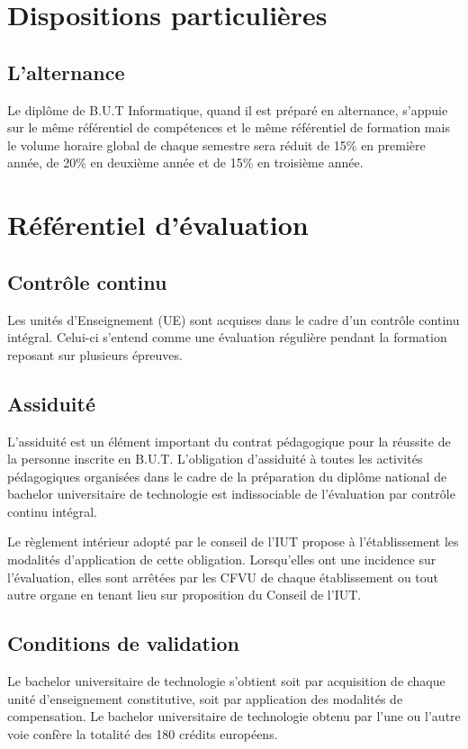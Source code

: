 \documentclass[10pt]{article}
\begin{document}
\section{Dispositions particulières}
\subsection{L'alternance}
Le diplôme de B.U.T Informatique, quand il est préparé en alternance,
s’appuie sur le même référentiel de compétences et le même
référentiel de formation mais le volume horaire global de chaque
semestre sera réduit de 15\% en première année, de 20\% en
deuxième année et de 15\% en troisième année.

\section[Référentiel d'évaluation]{Référentiel d'évaluation}

\subsection{Contrôle continu}
Les unités d'Enseignement (UE) sont acquises dans le cadre d'un contrôle continu intégral. Celui-ci
s'entend comme une évaluation régulière pendant la formation reposant sur plusieurs épreuves.

\subsection{Assiduité}
L'assiduité est un élément important du contrat pédagogique pour la
réussite de la personne inscrite en B.U.T. L'obligation d'assiduité à
toutes les activités pédagogiques organisées dans le cadre de la
préparation du diplôme national de bachelor universitaire de technologie
est indissociable de l'évaluation par contrôle continu intégral.

Le règlement intérieur adopté par le conseil de l'IUT propose à
l'établissement les modalités d'application de cette
obligation. Lorsqu'elles ont une incidence sur l'évaluation, elles sont
arrêtées par les CFVU de chaque établissement ou tout autre organe en
tenant lieu sur proposition du Conseil de l'IUT.

\subsection{Conditions de validation}\label{conditions-validation}
Le bachelor universitaire de technologie s'obtient soit par acquisition
de chaque unité d'enseignement constitutive, soit par application des
modalités de compensation. Le bachelor universitaire de technologie
obtenu par l'une ou l'autre voie confère la totalité des 180 crédits
européens.
\end{document}
